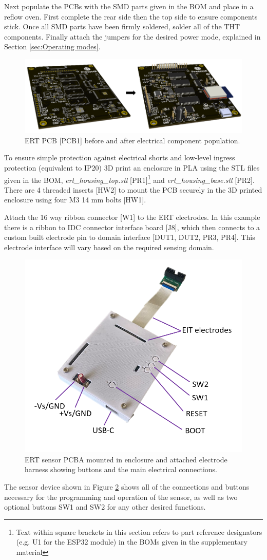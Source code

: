 Next populate the PCBs with the SMD parts given in the BOM and place in a reflow oven. First complete the rear side then the top side to ensure components stick. Once all SMD parts have been firmly soldered, solder all of the THT components. Finally attach the jumpers for the desired power mode, explained in Section \ref{sec:Operating modes}.
\begin{figure}[H]
	\centering
	\includegraphics[width=0.8\linewidth]{Figures/HV_ERT_sensor_PCB_unpop2pop.png}
	\caption{ERT PCB [PCB1] before and after electrical component population.}
	\label{fig:pcb_to_pcba}
\end{figure}
To ensure simple protection against electrical shorts and low-level ingress protection (equivalent to IP20) 3D print an enclosure in PLA using the STL files given in the BOM, \textit{ert\_housing\_top.stl} [PR1]\footnote{Text within square brackets in this section refers to part reference designators (e.g. U1 for the ESP32 module) in the BOMs given in the supplementary material} and \textit{ert\_housing\_base.stl} [PR2]. There are 4 threaded inserts [HW2] to mount the PCB securely in the 3D printed enclosure using four M3 14 mm bolts [HW1].

Attach the 16 way ribbon connector [W1] to the ERT electrodes. In this example there is a ribbon to IDC connector interface board [J8], which then connects to a custom built electrode pin to domain interface [DUT1, DUT2, PR3, PR4]. This electrode interface will vary based on the required sensing domain.
\begin{figure}[H]
	\centering
	\includegraphics[width=0.6\linewidth]{Figures/ERT_PCB_assembled_in_housing_labelled.png}
	\caption{ERT sensor PCBA mounted in enclosure and attached electrode harness showing buttons and the main electrical connections.}
	\label{fig:ert_sensor_in_housing}
\end{figure}
The sensor device shown in Figure \ref{fig:ert_sensor_in_housing} shows all of the connections and buttons necessary for the programming and operation of the sensor, as well as two optional buttons SW1 and SW2 for any other desired functions.

